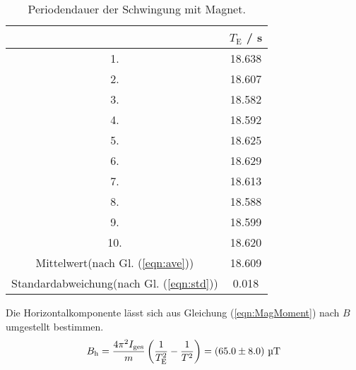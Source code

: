 \begin{table}[H] %
  \centering
  \begin{tabular}{c c}
    \toprule
    & $T_\text{E}$ / s \\
    \midrule
    1. & 18.638 \\
    2. & 18.607 \\
    3. & 18.582 \\
    4. & 18.592 \\
    5. & 18.625 \\
    6. & 18.629 \\
    7. & 18.613 \\
    8. & 18.588 \\
    9. & 18.599 \\
    10.& 18.620 \\
    \bottomrule
    Mittelwert(nach Gl. (\ref{eqn:ave})) & 18.609 \\
    Standardabweichung(nach Gl. (\ref{eqn:std})) & 0.018 \\
    \bottomrule
  \end{tabular}
  \caption{Periodendauer der Schwingung mit Magnet.}
  \label{tab:Periodendauer2}
\end{table}

Die Horizontalkomponente lässt sich aus Gleichung (\ref{eqn:MagMoment}) nach $B$ umgestellt bestimmen.
\begin{equation}
  B_\text{h} = \frac{4 \pi^2 I_\text{ges}}{m} \left(\frac{1}{T_\text{E}^2} - \frac{1}{T^2} \right) = (\num{65.0 +- 8.0}) \ \text{µT}
\end{equation}
